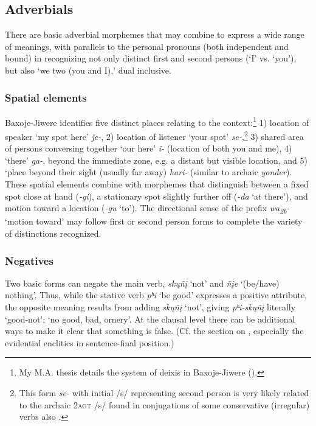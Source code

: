 \documentclass[output=paper]{LSP/langsci}
\begin{document}
\subsection{Adverbials}
There are basic adverbial morphemes that may combine to express a wide range of meanings, with parallels to the personal pronouns (both independent and bound) in recognizing not only distinct first and second persons (`I' vs. `you'), but also `we two (you and I),' dual inclusive.  

\subsubsection{Spatial elements}   

Baxoje-Jiwere identifies five distinct places relating to the  context:\footnote{My M.A. thesis details the system of deixis in Baxoje-Jiwere (\citealt{Hopkins1988}).} 1) location of speaker `my spot here' \textit{\v{j}e-},  2) location of  listener `your spot' \textit{se-},\footnote{This form \textit{se-} with initial /s/ representing second person is very likely related to the archaic \textsc{2agt} /s/ found in conjugations of some conservative (irregular) verbs also \citep[480]{Rankin2005b}.}  3) shared area of persons conversing together `our here' \textit{i-} (location of both you and me),  4) `there' \textit{ga-}, beyond the immediate  zone, e.g. a distant but visible location, and 5) `place beyond their sight (usually far away) \textit{hari-} (similar to archaic  \textit{yonder}).  These spatial elements combine with morphemes that distinguish between a fixed spot close at hand (\textit{-gi}), a stationary spot slightly further off (\textit{-da} `at there'), and motion toward a location (\textit{-gu} `to').  The directional sense of the prefix \textit{wa\textsubscript{2b}-} `motion toward' may follow first or second person forms to complete the variety of distinctions recognized. 
	
\subsubsection{Negatives} 

 Two basic forms can negate the main verb, \textit{sk\k{u}ñ\k{i}} `not' and \textit{ñ\k{i}e} `(be/have) nothing'.  Thus, while the stative verb \textit{pʰi} `be good' expresses a positive attribute, the opposite meaning results from adding \textit{sk\k{u}ñ\k{i}} `not', giving \textit{pʰi-sk\k{u}ñ\k{i}}  literally `good-not'; `no good, bad, ornery'.  At the clausal level there can be additional ways to make it clear that something is false.  (Cf. the section on , especially the evidential enclitics in sentence-final position.)  
\end{document}
